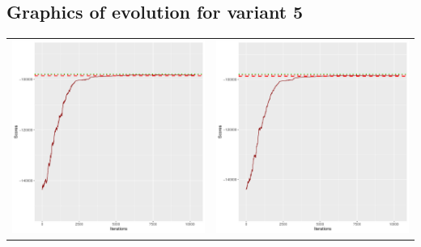 \documentclass[]{scrartcl}
\begin{document}
\clearpage

\subsection{Graphics of evolution for variant 5}

\begin{table}[h!]
\begin{tabular}{cc}
\includegraphics[scale = 0.4]{./figs/hepar2/v5/25/boundsEvolution-10352.pdf} & 
\includegraphics[scale = 0.4]{./figs/hepar2/v5/50/boundsEvolution-10352.pdf} \\

\end{tabular}
\end{table}
\end{document}
